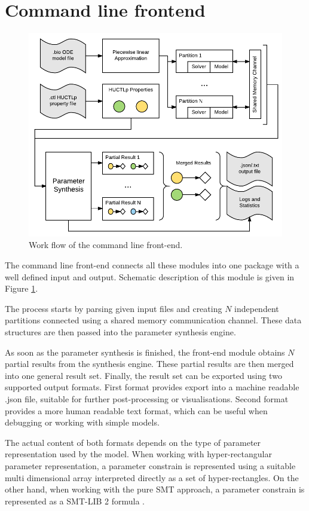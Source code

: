 \section{Command line frontend}

\begin{figure}[]
	\centering
	\includegraphics[scale=0.9]{media/cli_workflow.pdf}
	\caption{Work flow of the command line front-end. }
	\label{fig:cli_workflow}
\end{figure}

The command line front-end connects all these modules into one package with a well defined input and output. Schematic description of this module is given in Figure \ref{fig:cli_workflow}.

The process starts by parsing given input files and creating $N$ independent partitions connected using a shared memory communication channel. These data structures are then passed into the parameter synthesis engine.

As soon as the parameter synthesis is finished, the front-end module obtains $N$ partial results from the synthesis engine. These partial results are then merged into one general result set. Finally, the result set can be exported using two supported output formats. First format provides export into a machine readable .json file, suitable for further post-processing or visualisations. Second format provides a more human readable text format, which can be useful when debugging or working with simple models.

The actual content of both formats depends on the type of parameter representation used by the model. When working with hyper-rectangular parameter representation, a parameter constrain is represented using a suitable multi dimensional array interpreted directly as a set of hyper-rectangles. On the other hand, when working with the pure SMT approach, a parameter constrain is represented as a SMT-LIB 2 formula \cite{smtlib}.

